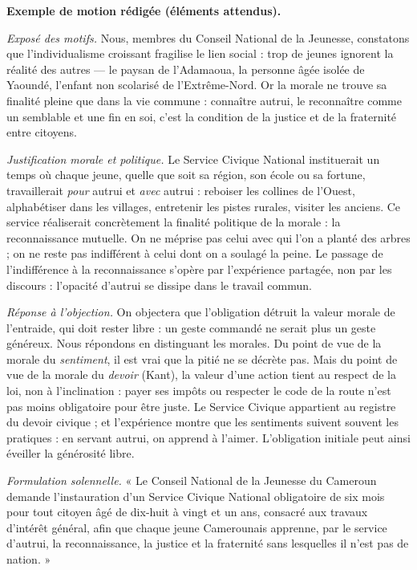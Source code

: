 \documentclass[11pt]{article}
\begin{document}
\begin{corrige}
\textbf{Exemple de motion rédigée (éléments attendus).}

\emph{Exposé des motifs.} Nous, membres du Conseil National de la Jeunesse, constatons que l'individualisme croissant fragilise le lien social : trop de jeunes ignorent la réalité des autres — le paysan de l'Adamaoua, la personne âgée isolée de Yaoundé, l'enfant non scolarisé de l'Extrême-Nord. Or la morale ne trouve sa finalité pleine que dans la vie commune : connaître autrui, le reconnaître comme un semblable et une fin en soi, c'est la condition de la justice et de la fraternité entre citoyens.

\emph{Justification morale et politique.} Le Service Civique National instituerait un temps où chaque jeune, quelle que soit sa région, son école ou sa fortune, travaillerait \emph{pour} autrui et \emph{avec} autrui : reboiser les collines de l'Ouest, alphabétiser dans les villages, entretenir les pistes rurales, visiter les anciens. Ce service réaliserait concrètement la finalité politique de la morale : la reconnaissance mutuelle. On ne méprise pas celui avec qui l'on a planté des arbres ; on ne reste pas indifférent à celui dont on a soulagé la peine. Le passage de l'indifférence à la reconnaissance s'opère par l'expérience partagée, non par les discours : l'opacité d'autrui se dissipe dans le travail commun.

\emph{Réponse à l'objection.} On objectera que l'obligation détruit la valeur morale de l'entraide, qui doit rester libre : un geste commandé ne serait plus un geste généreux. Nous répondons en distinguant les morales. Du point de vue de la morale du \emph{sentiment}, il est vrai que la pitié ne se décrète pas. Mais du point de vue de la morale du \emph{devoir} (Kant), la valeur d'une action tient au respect de la loi, non à l'inclination : payer ses impôts ou respecter le code de la route n'est pas moins obligatoire pour être juste. Le Service Civique appartient au registre du devoir civique ; et l'expérience montre que les sentiments suivent souvent les pratiques : en servant autrui, on apprend à l'aimer. L'obligation initiale peut ainsi éveiller la générosité libre.

\emph{Formulation solennelle.} « Le Conseil National de la Jeunesse du Cameroun demande l'instauration d'un Service Civique National obligatoire de six mois pour tout citoyen âgé de dix-huit à vingt et un ans, consacré aux travaux d'intérêt général, afin que chaque jeune Camerounais apprenne, par le service d'autrui, la reconnaissance, la justice et la fraternité sans lesquelles il n'est pas de nation. »


\end{corrige}
\end{document}
